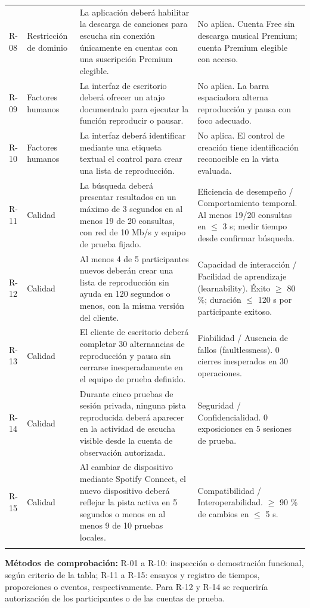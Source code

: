 \begin{longtable}{@{}p{.065\linewidth}p{.14\linewidth}p{.44\linewidth}p{.29\linewidth}@{}}
R-08 & Restricción de dominio & La aplicación deberá habilitar la descarga de canciones para escucha sin conexión únicamente en cuentas con una suscripción Premium elegible. & No aplica. Cuenta Free sin descarga musical Premium; cuenta Premium elegible con acceso.\\\addlinespace[0pt]
R-09 & Factores humanos & La interfaz de escritorio deberá ofrecer un atajo documentado para ejecutar la función reproducir o pausar. & No aplica. La barra espaciadora alterna reproducción y pausa con foco adecuado.\\\addlinespace[0pt]
R-10 & Factores humanos & La interfaz deberá identificar mediante una etiqueta textual el control para crear una lista de reproducción. & No aplica. El control de creación tiene identificación reconocible en la vista evaluada.\\\addlinespace[0pt]
R-11 & Calidad & La búsqueda deberá presentar resultados en un máximo de 3 segundos en al menos 19 de 20 consultas, con red de 10 Mb/s y equipo de prueba fijado. & Eficiencia de desempeño / Comportamiento temporal. Al menos 19/20 consultas en $\leq$ 3 s; medir tiempo desde confirmar búsqueda.\\\addlinespace[0pt]
R-12 & Calidad & Al menos 4 de 5 participantes nuevos deberán crear una lista de reproducción sin ayuda en 120 segundos o menos, con la misma versión del cliente. & Capacidad de interacción / Facilidad de aprendizaje (learnability). Éxito $\geq$ 80 \%; duración $\leq$ 120 s por participante exitoso.\\\addlinespace[0pt]
R-13 & Calidad & El cliente de escritorio deberá completar 30 alternancias de reproducción y pausa sin cerrarse inesperadamente en el equipo de prueba definido. & Fiabilidad / Ausencia de fallos (faultlessness). 0 cierres inesperados en 30 operaciones.\\\addlinespace[0pt]
R-14 & Calidad & Durante cinco pruebas de sesión privada, ninguna pista reproducida deberá aparecer en la actividad de escucha visible desde la cuenta de observación autorizada. & Seguridad / Confidencialidad. 0 exposiciones en 5 sesiones de prueba.\\\addlinespace[0pt]
R-15 & Calidad & Al cambiar de dispositivo mediante Spotify Connect, el nuevo dispositivo deberá reflejar la pista activa en 5 segundos o menos en al menos 9 de 10 pruebas locales. & Compatibilidad / Interoperabilidad. $\geq$ 90 \% de cambios en $\leq$ 5 s.\\\addlinespace[0pt]
\bottomrule\end{longtable}\endgroup
\textbf{Métodos de comprobación:} R-01 a R-10: inspección o demostración funcional, según criterio de la tabla; R-11 a R-15: ensayos y registro de tiempos, proporciones o eventos, respectivamente. Para R-12 y R-14 se requeriría autorización de los participantes o de las cuentas de prueba.
